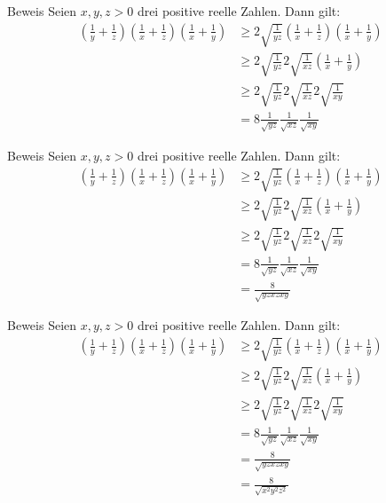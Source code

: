 \documentclass[10pt]{beamer}
\begin{document}
\begin{frame}{Beweis}
    Seien \(x, y, z > 0\) drei positive reelle Zahlen. Dann gilt:
    \begin{align*}
        \left( \frac{1}{y} + \frac{1}{z} \right) \left( \frac{1}{x} + \frac{1}{z} \right) \left( \frac{1}{x} + \frac{1}{y} \right)
        & \geq 2\sqrt{\frac{1}{yz}} \left( \frac{1}{x} + \frac{1}{z} \right) \left( \frac{1}{x} + \frac{1}{y} \right) \\
        & \geq 2\sqrt{\frac{1}{yz}} 2\sqrt{\frac{1}{xz}} \left( \frac{1}{x} + \frac{1}{y} \right) \\
        & \geq 2\sqrt{\frac{1}{yz}} 2\sqrt{\frac{1}{xz}} 2\sqrt{\frac{1}{xy}} \\
        & = 8 \frac{1}{\sqrt{yz}} \frac{1}{\sqrt{xz}} \frac{1}{\sqrt{xy}}
    \end{align*}
\end{frame}



\begin{frame}{Beweis}
    Seien \(x, y, z > 0\) drei positive reelle Zahlen. Dann gilt:
    \begin{align*}
        \left( \frac{1}{y} + \frac{1}{z} \right) \left( \frac{1}{x} + \frac{1}{z} \right) \left( \frac{1}{x} + \frac{1}{y} \right)
        & \geq 2\sqrt{\frac{1}{yz}} \left( \frac{1}{x} + \frac{1}{z} \right) \left( \frac{1}{x} + \frac{1}{y} \right) \\
        & \geq 2\sqrt{\frac{1}{yz}} 2\sqrt{\frac{1}{xz}} \left( \frac{1}{x} + \frac{1}{y} \right) \\
        & \geq 2\sqrt{\frac{1}{yz}} 2\sqrt{\frac{1}{xz}} 2\sqrt{\frac{1}{xy}} \\
        & = 8 \frac{1}{\sqrt{yz}} \frac{1}{\sqrt{xz}} \frac{1}{\sqrt{xy}} \\
        & = \frac{8}{\sqrt{yz xz xy}}
    \end{align*}
\end{frame}



\begin{frame}{Beweis}
    Seien \(x, y, z > 0\) drei positive reelle Zahlen. Dann gilt:
    \begin{align*}
        \left( \frac{1}{y} + \frac{1}{z} \right) \left( \frac{1}{x} + \frac{1}{z} \right) \left( \frac{1}{x} + \frac{1}{y} \right)
        & \geq 2\sqrt{\frac{1}{yz}} \left( \frac{1}{x} + \frac{1}{z} \right) \left( \frac{1}{x} + \frac{1}{y} \right) \\
        & \geq 2\sqrt{\frac{1}{yz}} 2\sqrt{\frac{1}{xz}} \left( \frac{1}{x} + \frac{1}{y} \right) \\
        & \geq 2\sqrt{\frac{1}{yz}} 2\sqrt{\frac{1}{xz}} 2\sqrt{\frac{1}{xy}} \\
        & = 8 \frac{1}{\sqrt{yz}} \frac{1}{\sqrt{xz}} \frac{1}{\sqrt{xy}} \\
        & = \frac{8}{\sqrt{yz xz xy}} \\
        & = \frac{8}{\sqrt{x^{2} y^{2} z^{2}}}
    \end{align*}
\end{frame}
\end{document}
